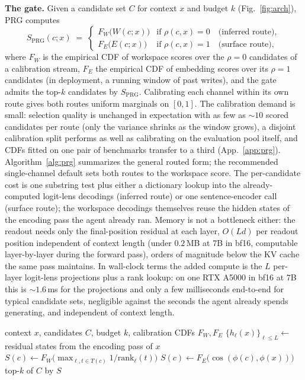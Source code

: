 \textbf{The gate.}
Given a candidate set $C$ for context $x$ and budget $k$ (Fig.~\ref{fig:arch}),
PRG computes
\begin{equation}
S_{\mathrm{PRG}}(c; x) \;=\;
\begin{cases}
F_{W}\!\big(W(c;x)\big) & \text{if } \rho(c,x)=0 \quad\text{(inferred route)},\\[3pt]
F_{E}\!\big(E(c;x)\big) & \text{if } \rho(c,x)=1 \quad\text{(surface route)},
\end{cases}
\label{eq:prg}
\end{equation}
where $F_{W}$ is the empirical CDF of workspace scores over the $\rho{=}0$
candidates of a calibration stream, $F_{E}$ the empirical CDF of embedding
scores over its $\rho{=}1$ candidates (in deployment, a running window of past
writes), and the gate admits the top-$k$ candidates by $S_{\mathrm{PRG}}$.
Calibrating each channel within its own route gives both routes uniform
marginals on $[0,1]$. The calibration demand is small: selection quality is
unchanged in expectation with as few as ${\sim}10$ scored candidates per route
(only the variance shrinks as the window grows), a disjoint calibration split
performs as well as calibrating on the evaluation pool itself, and CDFs fitted
on one pair of benchmarks transfer to a third (App.~\ref{app:prg}).
Algorithm~\ref{alg:prg} summarizes the general routed form; the recommended
single-channel default sets both routes to the workspace score. The per-candidate cost is one
substring test plus either a dictionary lookup into the already-computed
logit-lens decodings (inferred route) or one sentence-encoder call (surface
route); the workspace decodings themselves reuse the hidden states of the
encoding pass the agent already ran. Memory is not a bottleneck either: the
readout needs only the final-position residual at each layer, $O(Ld)$ per
readout position independent of context length (under $0.2$\,MB at 7B in
bf16, computable layer-by-layer during the forward pass), orders of
magnitude below the KV cache the same pass maintains.
In wall-clock terms the added compute is the $L$ per-layer logit-lens
projections plus a rank lookup: on one RTX A5000 in bf16 at 7B this is
${\sim}1.6$\,ms for the projections and only a few milliseconds end-to-end for
typical candidate sets, negligible against the seconds the agent already spends
generating, and independent of context length.

\begin{algorithm}[t]
\caption{PRG: provenance-routed write admission}
\label{alg:prg}
\begin{algorithmic}[1]
\Require context $x$, candidates $C$, budget $k$, calibration CDFs $F_W, F_E$
\State $\{h_\ell(x)\}_{\ell \le L} \gets$ residual states from the encoding pass of $x$
   
    \State $S(c) \gets F_W\!\big(\max_{\ell, t \in T(c)} 1/\mathrm{rank}_\ell(t)\big)$ 
  \Else
    \State $S(c) \gets F_E\!\big(\cos(\phi(c), \phi(x))\big)$ 
  \EndIf
\EndFor
\State \Return top-$k$ of $C$ by $S$
\end{algorithmic}
\end{algorithm}

